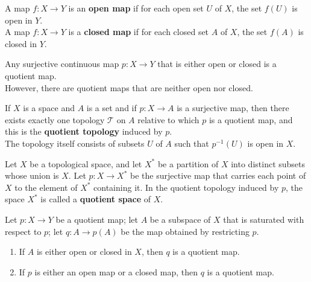 \begin{definition}
A map $f \colon  X \rightarrow Y$ is an \textbf{open map} if for each open set $U$ of $X$, the set $f(U)$ is open in $Y$. \\

A map $f \colon  X \rightarrow Y$ is a \textbf{closed map} if for each closed set $A$ of $X$, the set $f(A)$ is closed in $Y$.
\end{definition}

\begin{remark}
Any surjective continuous map $p\colon X \rightarrow Y$ that is either open or closed is a quotient map. \\

However, there are quotient maps that are neither open nor closed.
\end{remark}

\begin{definition}
If $X$ is a space and $A$ is a set and if $p \colon X \rightarrow A$ is a surjective map, then there exists exactly one topology $\mathscr{T}$ on $A$ relative to which
$p$ is a quotient map, and this is the \textbf{quotient topology} induced by $p$. \\

The topology itself consists of subsets $U$ of $A$ such that $p^{-1}(U)$ is open in $X$.
\end{definition}

\begin{definition}
Let $X$ be a topological space, and let $X^*$ be a partition of $X$ into distinct subsets whose union is $X$. Let $p \colon  X \rightarrow  X^*$ be the surjective map that
carries each point of $X$ to the element of $X^*$ containing it. In the quotient topology induced by $p$, the space $X^*$ is called a \textbf{quotient space} of $X$.
\end{definition}

\begin{theorem}
Let $p\colon X \rightarrow Y$ be a quotient map; let $A$ be a subspace of $X$ that is saturated with respect to $p$; let $q \colon A \rightarrow p(A)$ be the map obtained by restricting $p$.
\begin{enumerate}
    \item If $A$ is either open or closed in $X$, then $q$ is a quotient map.
    \item If $p$ is either an open map or a closed map, then $q$ is a quotient map.
\end{enumerate}
\end{theorem}


